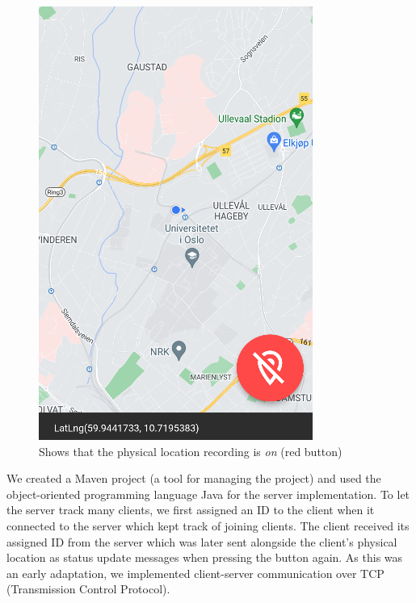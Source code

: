 \documentclass{article}
\begin{document}
\begin{figure}[H]
\begin{minipage}[c]{0.34\linewidth}
        \includegraphics[width=\linewidth]{graphics/recording_on.png}
        \caption{Shows that the physical location recording is \emph{on} (red button)}
        \label{fig:recording_on}
    \end{minipage}
\end{figure}

We created a Maven project (a tool for managing the project) and used the object-oriented programming language Java for the server implementation. To let the server track many clients, we first assigned an ID to the client when it connected to the server which kept track of joining clients. The client received its assigned ID from the server which was later sent alongside the client's physical location as status update messages when pressing the button again. As this was an early adaptation, we implemented client-server communication over TCP (Transmission Control Protocol).
\end{document}

